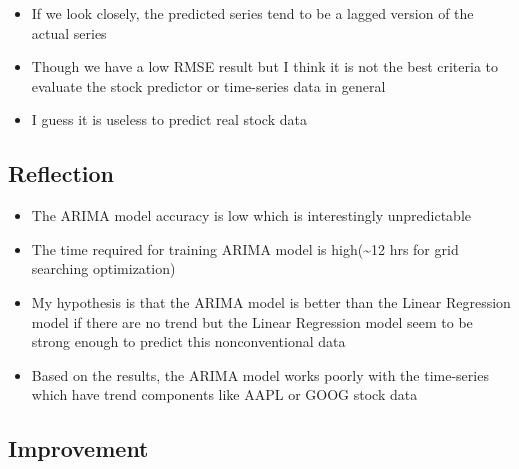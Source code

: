 \documentclass[11pt]{article}
\providecommand{\tightlist}{%
      \setlength{\itemsep}{0pt}\setlength{\parskip}{0pt}}
\begin{document}
\begin{itemize}
\tightlist
\item
  If we look closely, the predicted series tend to be a lagged version
  of the actual series
\item
  Though we have a low RMSE result but I think it is not the best
  criteria to evaluate the stock predictor or time-series data in
  general
\item
  I guess it is useless to predict real stock data
\end{itemize}

\subsection{Reflection}\label{reflection}

\begin{itemize}
\tightlist
\item
  The ARIMA model accuracy is low which is interestingly unpredictable
\item
  The time required for training ARIMA model is high(\textasciitilde{}12
  hrs for grid searching optimization)
\item
  My hypothesis is that the ARIMA model is better than the Linear
  Regression model if there are no trend but the Linear Regression model
  seem to be strong enough to predict this nonconventional data
\item
  Based on the results, the ARIMA model works poorly with the
  time-series which have trend components like AAPL or GOOG stock data
\end{itemize}

\subsection{Improvement}\label{improvement}
\end{document}

